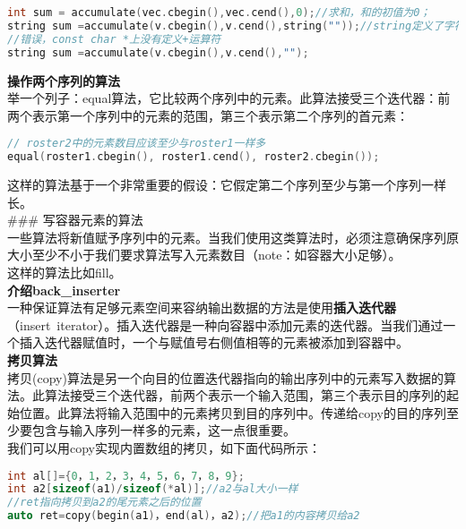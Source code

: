 \documentclass[
  a4paper,
  oneside,tablecaptionabove
]{scrbook}
\begin{document}
\begin{lstlisting}[language={C++}]
int sum = accumulate(vec.cbegin(),vec.cend(),0);//求和，和的初值为0；
string sum =accumulate(v.cbegin(),v.cend(),string(""));//string定义了字符串的“+”法，
//错误，const char *上没有定义+运算符
string sum =accumulate(v.cbegin(),v.cend(),"");
\end{lstlisting}

\textbf{操作两个序列的算法}\\
举一个列子：equal算法，它比较两个序列中的元素。此算法接受三个迭代器：前两个表示第一个序列中的元素的范围，第三个表示第二个序列的首元素：

\begin{lstlisting}[language={C++}]
// roster2中的元素数目应该至少与roster1一样多
equal(roster1.cbegin(), roster1.cend(), roster2.cbegin());
\end{lstlisting}

这样的算法基于一个非常重要的假设：它假定第二个序列至少与第一个序列一样长。\\
\#\#\# 写容器元素的算法\\
一些算法将新值赋予序列中的元素。当我们使用这类算法时，必须注意确保序列原大小至少不小于我们要求算法写入元素数目（note：如容器大小足够）。\\
这样的算法比如fill。\\
\textbf{介绍back\_inserter}\\
一种保证算法有足够元素空间来容纳输出数据的方法是使用\textbf{插入迭代器}（insert~iterator）。插入迭代器是一种向容器中添加元素的迭代器。当我们通过一个插入迭代器赋值时，一个与赋值号右侧值相等的元素被添加到容器中。\\
\textbf{拷贝算法}\\
拷贝(copy)算法是另一个向目的位置迭代器指向的输出序列中的元素写入数据的算法。此算法接受三个迭代器，前两个表示一个输入范围，第三个表示目的序列的起始位置。此算法将输入范围中的元素拷贝到目的序列中。传递给copy的目的序列至少要包含与输入序列一样多的元素，这一点很重要。\\
我们可以用copy实现内置数组的拷贝，如下面代码所示：

\begin{lstlisting}[language={C++}]
int al[]={0，1，2，3，4，5，6，7，8，9};
int a2[sizeof(a1)/sizeof(*al)];//a2与al大小一样
//ret指向拷贝到a2的尾元素之后的位置
auto ret=copy(begin(a1)，end(al)，a2);//把a1的内容拷贝给a2
\end{lstlisting}
\end{document}
